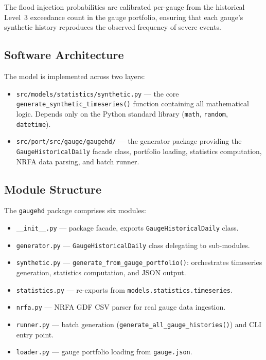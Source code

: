 \documentclass[11pt,a4paper]{article}
\begin{document}
\noindent The flood injection probabilities are calibrated per-gauge from the historical
Level~3 exceedance count in the gauge portfolio, ensuring that each gauge's synthetic
history reproduces the observed frequency of severe events.

\mkmimplementation

\subsection{Software Architecture}

The model is implemented across two layers:

\begin{itemize}[nosep]
    \item \texttt{src/models/statistics/synthetic.py} --- the core
          \texttt{generate\_synthetic\_timeseries()} function containing all mathematical
          logic. Depends only on the Python standard library (\texttt{math},
          \texttt{random}, \texttt{datetime}).
    \item \texttt{src/port/src/gauge/gaugehd/} --- the generator package providing the
          \texttt{GaugeHistoricalDaily} facade class, portfolio loading, statistics
          computation, NRFA data parsing, and batch runner.
\end{itemize}

\subsection{Module Structure}

The \texttt{gaugehd} package comprises six modules:

\begin{itemize}[nosep]
    \item \texttt{\_\_init\_\_.py} --- package facade, exports \texttt{GaugeHistoricalDaily}
          class.
    \item \texttt{generator.py} --- \texttt{GaugeHistoricalDaily} class delegating to
          sub-modules.
    \item \texttt{synthetic.py} --- \texttt{generate\_from\_gauge\_portfolio()}: orchestrates
          timeseries generation, statistics computation, and JSON output.
    \item \texttt{statistics.py} --- re-exports from \texttt{models.statistics.timeseries}.
    \item \texttt{nrfa.py} --- NRFA GDF CSV parser for real gauge data ingestion.
    \item \texttt{runner.py} --- batch generation (\texttt{generate\_all\_gauge\_histories()})
          and CLI entry point.
    \item \texttt{loader.py} --- gauge portfolio loading from \texttt{gauge.json}.
\end{itemize}
\end{document}
